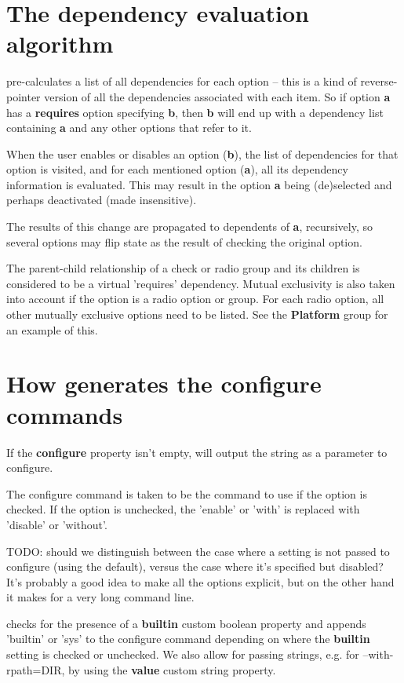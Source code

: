 \section{The dependency evaluation algorithm}

\ctshortname pre-calculates a list of all dependencies
for each option -- this is a kind of reverse-pointer version
of all the dependencies associated with each item. So
if option {\bf a} has a {\bf requires} option specifying
{\bf b}, then {\bf b} will end up with a dependency list
containing {\bf a} and any other options that refer to it.

When the user enables or disables an option ({\bf b}),
the list of dependencies for that option is visited,
and for each mentioned option ({\bf a}), all its dependency information
is evaluated. This may result in the option {\bf a} being
(de)selected and perhaps deactivated (made insensitive).

The results of this change are propagated to dependents of
{\bf a}, recursively, so several options may flip state
as the result of checking the original option.

The parent-child relationship of a check or radio
group and its children is considered to be a virtual
'requires' dependency. Mutual exclusivity is also
taken into account if the option is a radio option
or group. For each radio option, all other mutually
exclusive options need to be listed. See the
{\bf Platform} group for an example of this.

\section{How \ctshortname generates the configure commands}

If the {\bf configure} property isn't empty,
\ctshortname will output the string as a parameter
to configure.

The configure command is taken to be the command to
use if the option is checked. If the option is
unchecked, the 'enable' or 'with' is replaced with
'disable' or 'without'.

TODO: should we distinguish between the case
where a setting is not passed to configure (using
the default), versus the case where it's specified but disabled?
It's probably a good idea to make all the options
explicit, but on the other hand it makes for a very long
command line.

\ctshortname checks for the presence of a
{\bf builtin} custom boolean property and appends 'builtin' or
'sys' to the configure command depending on where
the {\bf builtin} setting is checked or unchecked.
We also allow for passing strings, e.g. for --with-rpath=DIR,
by using the {\bf value} custom string property.


